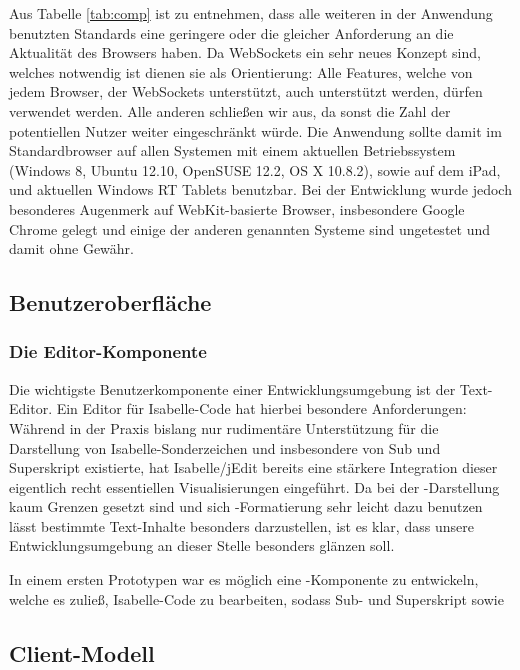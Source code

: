 Aus Tabelle \ref{tab:comp} ist zu entnehmen, dass alle weiteren in der Anwendung benutzten Standards
eine geringere oder die gleicher Anforderung an die Aktualität des Browsers haben. Da WebSockets ein
sehr neues Konzept sind, welches notwendig ist dienen sie als Orientierung: Alle Features, welche
von jedem Browser, der WebSockets unterstützt, auch unterstützt werden, dürfen verwendet werden.
Alle anderen schließen wir aus, da sonst die Zahl der potentiellen Nutzer weiter eingeschränkt
würde. Die Anwendung sollte damit im Standardbrowser auf allen Systemen mit einem aktuellen
Betriebssystem (Windows 8, Ubuntu 12.10, OpenSUSE 12.2, OS X 10.8.2), sowie auf dem iPad, und
aktuellen Windows RT Tablets benutzbar. Bei der Entwicklung wurde jedoch besonderes Augenmerk auf
WebKit-basierte Browser, insbesondere Google Chrome gelegt und einige der anderen genannten Systeme
sind ungetestet und damit ohne Gewähr.

\subsection{Benutzeroberfläche}



\subsubsection{Die Editor-Komponente}

Die wichtigste Benutzerkomponente einer Entwicklungsumgebung ist der Text-Editor. Ein Editor für
Isabelle-Code hat hierbei besondere Anforderungen: Während in der Praxis bislang nur rudimentäre
Unterstützung für die Darstellung von Isabelle-Sonderzeichen und insbesondere von Sub und
Superskript existierte, hat Isabelle/jEdit bereits eine stärkere Integration dieser eigentlich recht
essentiellen Visualisierungen eingeführt. Da bei der -Darstellung kaum Grenzen gesetzt
sind und sich -Formatierung sehr leicht dazu benutzen lässt bestimmte Text-Inhalte
besonders darzustellen, ist es klar, dass unsere Entwicklungsumgebung an dieser Stelle besonders
glänzen soll.

In einem ersten Prototypen war es möglich eine -Komponente zu entwickeln, welche es zuließ,
Isabelle-Code zu bearbeiten, sodass Sub- und Superskript sowie

\subsection{Client-Modell}

\subsection{}
